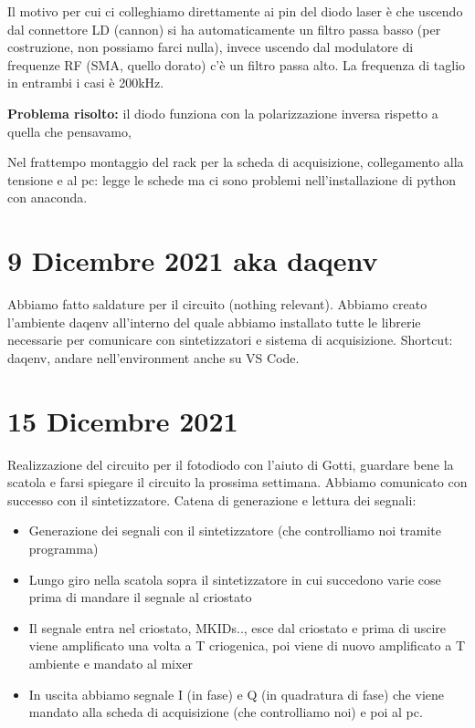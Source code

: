 \documentclass{article}
\numberwithin{equation}{section}
\begin{document}
Il motivo per cui ci colleghiamo direttamente ai pin del diodo laser è che uscendo dal connettore LD (cannon) si ha automaticamente un filtro passa basso (per costruzione, non possiamo farci nulla), invece uscendo dal modulatore di frequenze RF (SMA, quello dorato) c'è un filtro passa alto. La frequenza di taglio in entrambi i casi è 200kHz.

\textbf{Problema risolto:} il diodo funziona con la polarizzazione inversa rispetto a quella che pensavamo,

Nel frattempo montaggio del rack per la scheda di acquisizione, collegamento alla tensione e al pc: legge le schede ma ci sono problemi nell'installazione di python con anaconda.


\section{9 Dicembre 2021 aka daqenv}
Abbiamo fatto saldature per il circuito (nothing relevant).
Abbiamo creato l'ambiente daqenv all'interno del quale abbiamo installato tutte le librerie necessarie per comunicare con sintetizzatori e sistema di acquisizione.
Shortcut: daqenv, andare nell'environment anche su VS Code.
\section{15 Dicembre 2021}
Realizzazione del circuito per il fotodiodo con l'aiuto di Gotti, guardare bene la scatola e farsi spiegare il circuito la prossima settimana.
Abbiamo comunicato con successo con il sintetizzatore.
Catena di generazione e lettura dei segnali:
\begin{itemize}
    \item Generazione dei segnali con il sintetizzatore (che controlliamo noi tramite programma)
    \item Lungo giro nella scatola sopra il sintetizzatore in cui succedono varie cose prima di mandare il segnale al criostato
    \item Il segnale entra nel criostato, MKIDs.., esce dal criostato e prima di uscire viene amplificato una volta a T criogenica, poi viene di nuovo amplificato a T ambiente e mandato al mixer \item In uscita abbiamo segnale I (in fase) e Q (in quadratura di fase) che viene mandato alla scheda di acquisizione (che controlliamo noi) e poi al pc.
\end{itemize}
\end{document}
